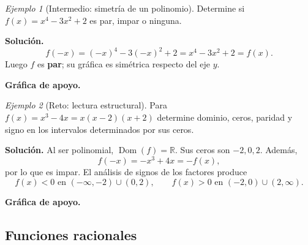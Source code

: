 \documentclass[12pt]{article}
\theoremstyle{remark}
\newtheorem{ejemplo}{Ejemplo}[section]
\newcommand{\R}{\mathbb{R}}
\newcommand{\Dom}{\operatorname{Dom}}
\begin{document}
\begin{ejemplo}[Intermedio: simetría de un polinomio]
Determine si $f(x)=x^4-3x^2+2$ es par, impar o ninguna.

\textbf{Solución.}
\[
f(-x)=(-x)^4-3(-x)^2+2=x^4-3x^2+2=f(x).
\]
Luego $f$ es \textbf{par}; su gráfica es simétrica respecto del eje $y$.


\textbf{Gráfica de apoyo.}\medskip
\begin{center}
\end{center}

\end{ejemplo}

\begin{ejemplo}[Reto: lectura estructural]
Para $f(x)=x^3-4x=x(x-2)(x+2)$ determine dominio, ceros, paridad y signo en los intervalos determinados por sus ceros.

\textbf{Solución.} Al ser polinomial, $\Dom(f)=\R$. Sus ceros son $-2,0,2$. Además,
\[
f(-x)=-x^3+4x=-f(x),
\]
por lo que es impar. El análisis de signos de los factores produce
\[
f(x)<0\text{ en }(-\infty,-2)\cup(0,2),
\qquad
f(x)>0\text{ en }(-2,0)\cup(2,\infty).
\]


\textbf{Gráfica de apoyo.}\medskip
\begin{center}
\end{center}

\end{ejemplo}

\subsection*{Funciones racionales}
\end{document}
